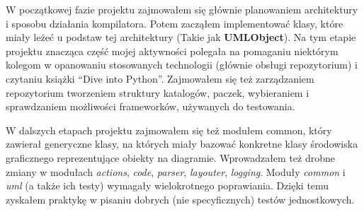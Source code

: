 W początkowej fazie projektu zajmowałem się głównie planowaniem architektury i sposobu działania kompilatora.
Potem zacząłem implementować klasy, które miały leżeć u podstaw tej architektury (Takie jak \textbf{UMLObject}).
Na tym etapie projektu znacząca część mojej aktywności polegała na pomaganiu niektórym kolegom w opanowaniu stosowanych technologii (głównie obsługi repozytorium) i czytaniu książki ``Dive into Python''.
Zajmowałem się też zarządzaniem repozytorium \dywiz tworzeniem struktury katalogów, paczek, wybieraniem i sprawdzaniem możliwości frameworków, używanych do testowania.

W dalszych etapach projektu zajmowałem się też modułem common, który zawierał generyczne klasy, na których miały bazować konkretne klasy środowiska graficznego reprezentujące obiekty na diagramie.
Wprowadzałem też drobne zmiany w modułach \emph{actions}, \emph{code}, \emph{parser}, \emph{layouter}, \emph{logging}.
Moduły \emph{common} i \emph{uml} (a także ich testy) wymagały wielokrotnego poprawiania.
Dzięki temu zyskałem praktykę w pisaniu dobrych (nie specyficznych) testów jednostkowych.
